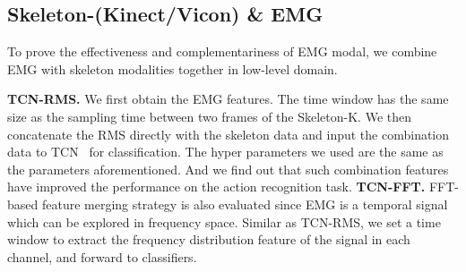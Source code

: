 \documentclass[a4paper, 10pt, conference]{ieeeconf}      \usepackage{FG2020}
\begin{document}
\subsection{Skeleton-(Kinect/Vicon) \& EMG}
To prove the effectiveness and complementariness of EMG modal, we combine EMG with skeleton modalities together in low-level domain.

\noindent\textbf{TCN-RMS.} We first obtain the EMG features. The time window has the same size as the sampling time between two frames of the Skeleton-K. We then concatenate the RMS directly with the skeleton data and input the combination data to TCN~\cite{skeleton_tcn} for classification. The hyper parameters we used are the same as the parameters aforementioned. And we find out that such combination features have improved the performance on the action recognition task. \textbf{TCN-FFT.} FFT-based feature merging strategy is also evaluated since EMG is a temporal signal which can be explored in frequency space. Similar as TCN-RMS, we set a time window to extract the frequency distribution feature of the signal in each channel, and forward to classifiers.
\end{document}
